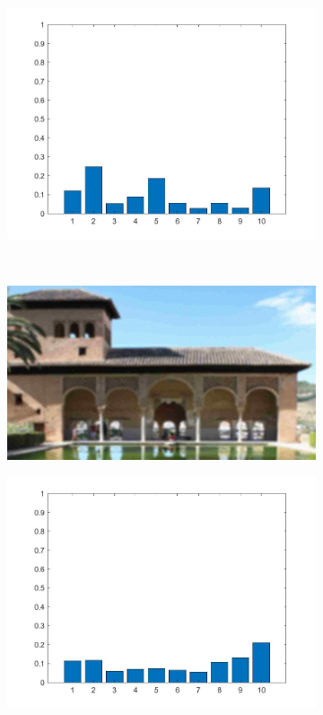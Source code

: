 \begin{figure}
\begin{subfigure}[b]{0.3\textwidth}
         \includegraphics[width= \textwidth]{./figs/wighted_histogram}
         \caption{}
         \label{}
     \end{subfigure}
     \\
     \begin{subfigure}[b]{0.3\textwidth}
         \centering
         \includegraphics[width=\textwidth]{./figs/img225}
         \caption{}
         \label{}
     \end{subfigure}
     \hfill
     \begin{subfigure}[b]{0.3\textwidth}
         \centering
         \includegraphics[width=\textwidth]{./figs/simple_histogram2}

\end{subfigure}
\end{figure}
